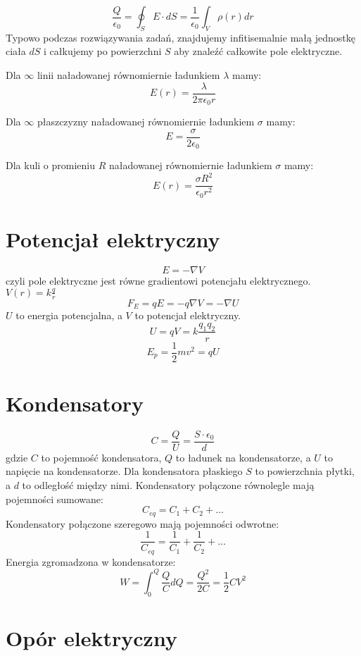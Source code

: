 \documentclass{../konspekt}
\begin{document}
\begin{multicols}{2}
  $$
  \frac{Q}{\epsilon_0} = \oint_S E \cdot dS = \frac{1}{\epsilon_0}
  \int_V \rho(r) dr
  $$
  Typowo podczas rozwiązywania zadań, znajdujemy infitisemalnie małą jednostkę
  ciała $dS$ i całkujemy po powierzchni $S$ aby znaleźć całkowite pole
  elektryczne.

  \begin{multicols}{3}
    \noindent
    Dla $\infty$ linii naładowanej równomiernie
    ładunkiem $\lambda$ mamy:
    $$
    E(r) = \frac{\lambda}{2\pi\epsilon_0 r}
    $$

    \noindent
    Dla $\infty$ płaszczyzny naładowanej równomiernie
    ładunkiem $\sigma$ mamy:
    $$
    E = \frac{\sigma}{2\epsilon_0}
    $$

    \noindent
    Dla kuli o promieniu $R$ naładowanej równomiernie
    ładunkiem $\sigma$ mamy:
    $$
    E(r) = \frac{\sigma R^2}{\epsilon_0 r^2}
    $$
  \end{multicols}

  \section{Potencjał elektryczny}

  $$
  E = - \nabla V
  $$
  czyli pole elektryczne jest równe gradientowi potencjału
  elektrycznego. $V(r) = k\frac{q}{r}$
  $$
  F_E = qE = -q \nabla V = - \nabla U
  $$
  $U$ to energia potencjalna, a $V$ to potencjał elektryczny.
  $$
  U = qV = k \frac{q_1 q_2}{r}
  $$
  $$
  E_p = \frac{1}{2} m v^2 = qU
  $$

  \section{Kondensatory}

  $$
  C = \frac{Q}{U} = \frac{S \cdot \epsilon_0}{d}
  $$
  gdzie $C$ to pojemność kondensatora, $Q$ to ładunek na
  kondensatorze, a $U$ to napięcie na kondensatorze. Dla kondensatora
  płaskiego $S$ to powierzchnia płytki, a $d$ to odległość między
  nimi. Kondensatory połączone równolegle mają pojemności sumowane:
  $$
  C_{eq} = C_1 + C_2 + \ldots
  $$
  Kondensatory połączone szeregowo mają pojemności odwrotne:
  $$
  \frac{1}{C_{eq}} = \frac{1}{C_1} + \frac{1}{C_2} + \ldots
  $$
  Energia zgromadzona w kondensatorze:
  $$
  W = \int_{0}^{Q} \frac{Q}{C} dQ = \frac{Q^2}{2C} = \frac{1}{2} C V^2
  $$

  \section{Opór elektryczny}


\end{multicols}
\end{document}
